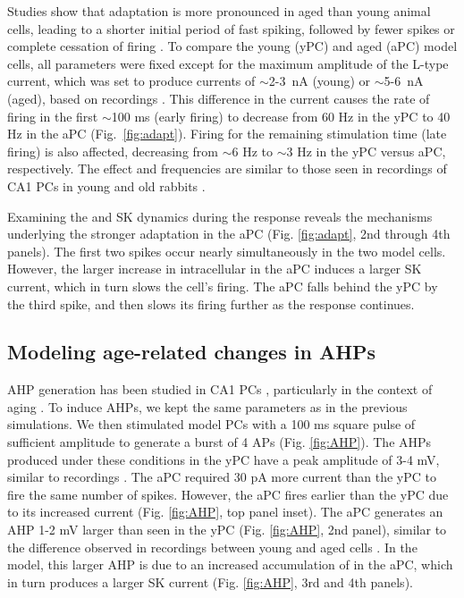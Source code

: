 \documentclass[12pt]{article}
\begin{document}
Studies show that adaptation is more pronounced in aged than young animal cells, leading to a shorter initial period of fast spiking, followed by fewer spikes or complete cessation of firing \citep{disterhoft1996calcium,gant2006early,moyer1992nimodipine,tombaugh2005slow}. To compare the young (yPC) and aged (aPC) model cells, all parameters were fixed except for the maximum amplitude of the L-type {\Ca} current, which was set to produce currents of $\sim$2-3~nA (young) or $\sim$5-6~nA (aged), based on recordings \citep{campbell1996aging}. This difference in the {\Ca} current causes the rate of firing in the first $\sim$100 ms (early firing) to decrease from 60 Hz in the yPC to 40 Hz in the aPC (Fig.~\ref{fig:adapt}). Firing for the remaining stimulation time (late firing) is also affected, decreasing from $\sim$6 Hz to $\sim$3 Hz in the yPC versus aPC, respectively. The effect and frequencies are similar to those seen in recordings of CA1 PCs in young and old rabbits \citep{moyer1992nimodipine}.

Examining the {\Ca} and SK dynamics during the response reveals the mechanisms underlying the stronger adaptation in the aPC (Fig. \ref{fig:adapt}, 2nd through 4th panels). The first two spikes occur nearly simultaneously in the two model cells. However, the larger increase in intracellular {\Ca} in the aPC induces a larger SK current, which in turn slows the cell's firing. The aPC falls behind the yPC by the third spike, and then slows its firing further as the response continues.

\subsection{Modeling age-related changes in AHPs}

AHP generation has been studied in CA1 PCs \citep{storm1989after}, particularly in the context of aging  \cite{disterhoft1996calcium,gant2006early,matthews2009fast,moyer1992nimodipine}. To induce AHPs, we kept the same parameters as in the previous simulations. We then stimulated model PCs with a 100 ms square pulse of sufficient amplitude to generate a burst of 4 APs (Fig. \ref{fig:AHP}). The AHPs produced under these conditions in the yPC have a peak amplitude of 3-4 mV, similar to recordings \citep{matthews2009fast,power2002age}. The aPC required 30 pA more current than the yPC to fire the same number of spikes. However, the aPC fires earlier than the yPC due to its increased {\Ca} current (Fig. \ref{fig:AHP}, top panel inset). The aPC generates an AHP 1-2 mV larger than seen in the yPC (Fig. \ref{fig:AHP}, 2nd panel), similar to the difference observed in recordings between young and aged cells \citep{moyer1992nimodipine,gant2006early,power2002age}. In the model, this larger AHP is due to an increased accumulation of {\Ca} in the aPC, which in turn produces a larger SK current (Fig. \ref{fig:AHP}, 3rd and 4th panels).
\end{document}

